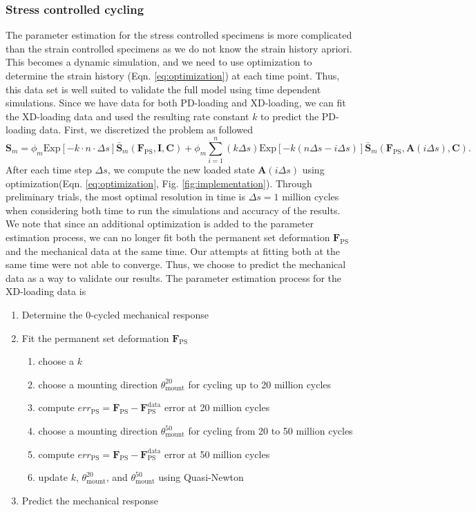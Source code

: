 \subsubsection{Stress controlled cycling}
The parameter estimation for the stress controlled specimens is more complicated than the strain controlled specimens as we do not know the strain history apriori. This becomes a dynamic simulation, and we need to use optimization to determine the strain history (Eqn. \ref{eq:optimization}) at each time point. Thus, this data set is well suited to validate the full model using time dependent simulations. Since we have data for both PD-loading and XD-loading, we can fit the XD-loading data and used the resulting rate constant $k $ to predict the PD-loading data. First, we discretized the problem as followed
\begin{equation} 
\mathbf{S}_m = \phi_m \mathrm{Exp} \left[-k  \cdot n \cdot \Delta s \right] \mathbf{\bar{S}}_m \left(\mathbf{F}_\mathrm{PS}, \mathbf{I},\mathbf{C}\right) + \phi_m \sum_{i = 1}^n  (k \Delta s) \mathrm{Exp}\left[-k (n\Delta s - i \Delta s)\right] \mathbf{\bar{S}}_m \left(\mathbf{F}_\mathrm{PS}, \mathbf{A}(i\Delta s),\mathbf{C}\right).
\end{equation}
After each time step $\Delta s$, we compute the new loaded state $\mathbf{A}(i\Delta s)$ using optimization(Eqn. \ref{eq:optimization}, Fig. \ref{fig:implementation}). Through preliminary trials, the most optimal resolution in time is $\Delta s = 1$ million cycles when considering both time to run the simulations and accuracy of the results. We note that since an additional optimization is added to the parameter estimation process, we can no longer fit both the permanent set deformation $\mathbf{F}_\mathrm{PS}$ and the mechanical data at the same time. Our attempts at fitting both at the same time were not able to converge. Thus, we choose to predict the mechanical data as a way to validate our results. 
The parameter estimation process for the XD-loading data is
\begin{enumerate}
\item Determine the 0-cycled mechanical response
\item Fit the permanent set deformation $\mathbf{F}_\mathrm{PS}$ 
	\begin{enumerate}
	\item choose a $k $
	\item choose a mounting direction $\theta_\mathrm{mount}^{20}$ for cycling up to 20 million cycles 
	\item compute $err_\mathrm{PS} = \mathbf{F}_\mathrm{PS} - \mathbf{F}_\mathrm{PS}^\mathrm{data}$ error at 20 million cycles
	\item choose a mounting direction $\theta_\mathrm{mount}^{50}$ for cycling from 20 to 50 million cycles 
	\item compute $err_\mathrm{PS} = \mathbf{F}_\mathrm{PS} - \mathbf{F}_\mathrm{PS}^\mathrm{data}$ error at 50 million cycles
	\item update $k$, $\theta_\mathrm{mount}^{20}$, and $\theta_\mathrm{mount}^{50}$ using Quasi-Newton
	\end{enumerate}
\item Predict the mechanical response 
\end{enumerate}
